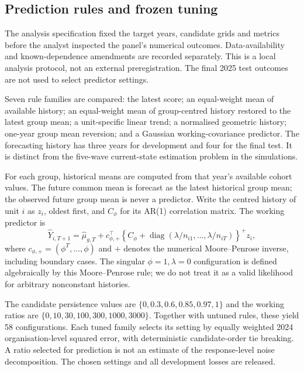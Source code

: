 \documentclass[11pt,letterpaper]{article}
\begin{document}
\subsection{Prediction rules and frozen tuning}
The analysis specification fixed the target years, candidate grids and metrics before the analyst inspected the panel's numerical outcomes. Data-availability and known-dependence amendments are recorded separately. This is a local analysis protocol, not an external preregistration. The final 2025 test outcomes are not used to select predictor settings.

Seven rule families are compared: the latest score; an equal-weight mean of available history; an equal-weight mean of group-centred history restored to the latest group mean; a unit-specific linear trend; a normalised geometric history; one-year group mean reversion; and a Gaussian working-covariance predictor. The forecasting history has three years for development and four for the final test. It is distinct from the five-wave current-state estimation problem in the simulations.

For each group, historical means are computed from that year's available cohort values. The future common mean is forecast as the latest historical group mean; the observed future group mean is never a predictor. Write the centred history of unit $i$ as $z_i$, oldest first, and $C_\phi$ for its AR(1) correlation matrix. The working predictor is
\begin{equation}
 \widehat Y_{i,T+1}=\widehat\mu_{g,T}+
 c_{\phi,+}^{\top}\left\{C_\phi+
       \operatorname{diag}(\lambda/n_{i1},\ldots,\lambda/n_{iT})\right\}^{+}z_i,
 \label{eq:working_forecast}
\end{equation}
where $c_{\phi,+}=(\phi^T,\ldots,\phi)$ and $+$ denotes the numerical Moore--Penrose inverse, including boundary cases. The singular $\phi=1,\lambda=0$ configuration is defined algebraically by this Moore--Penrose rule; we do not treat it as a valid likelihood for arbitrary nonconstant histories.

The candidate persistence values are $\{0,0.3,0.6,0.85,0.97,1\}$ and the working ratios are $\{0,10,30,100,300,1000,3000\}$. Together with untuned rules, these yield 58 configurations. Each tuned family selects its setting by equally weighted 2024 organisation-level squared error, with deterministic candidate-order tie breaking. A ratio selected for prediction is not an estimate of the response-level noise decomposition. The chosen settings and all development losses are released.
\end{document}
